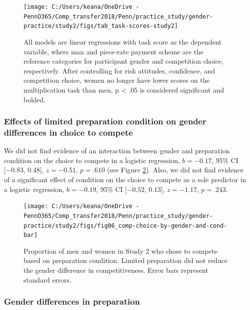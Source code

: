 \documentclass[a4paper, nobind]{templates/ociamthesis}
\begin{document}
\begin{figure}

{\centering \texttt{[image: C:/Users/keana/OneDrive - PennO365/Comp\_transfer2018/Penn/practice\_study/gender-practice/study2/figs/tab\_task-scores-study2]} 

}

\caption{All models are linear regressions with task score as the dependent variable, where man and piece-rate payment scheme are the reference categories for participant gender and competition choice, respectively. After controlling for risk attitudes, confidence, and competition choice, women no longer have lower scores on the multiplication task than men, p < .05 is considered significant and bolded.}\label{fig:tab-task-scores-study2}
\end{figure}

\hypertarget{effects-of-limited-preparation-condition-on-gender-differences-in-choice-to-compete}{%
\subsubsection{Effects of limited preparation condition on gender differences in choice to compete}\label{effects-of-limited-preparation-condition-on-gender-differences-in-choice-to-compete}}

We did not find evidence of an interaction between gender and preparation condition on the choice to compete in a logistic regression, \(b = -0.17\), 95\% CI \([-0.83\), \(0.48]\), \(z = -0.51\), \(p = .610\) (see Figure \ref{fig:s200}). Also, we did not find evidence of a significant effect of condition on the choice to compete as a sole predictor in a logistic regression, \(b = -0.19\), 95\% CI \([-0.52\), \(0.13]\), \(z = -1.17\), \(p = .243\).

\begin{figure}

{\centering \texttt{[image: C:/Users/keana/OneDrive - PennO365/Comp\_transfer2018/Penn/practice\_study/gender-practice/study2/figs/fig06\_comp-choice-by-gender-and-cond-bar]} 

}

\caption{Proportion of men and women in Study 2 who chose to compete based on preparation condition. Limited preparation did not reduce the gender difference in competitiveness. Error bars represent standard errors.}\label{fig:s200}
\end{figure}

\hypertarget{gender-differences-in-preparation-2}{%
\subsubsection{Gender differences in preparation}\label{gender-differences-in-preparation-2}}
\end{document}

